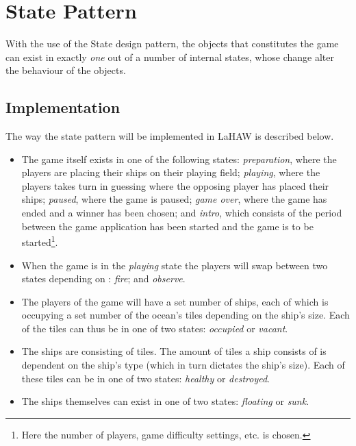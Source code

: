 
    \section{State Pattern}
    
    With the use of the State design pattern, the objects that constitutes the game can exist in exactly \emph{one} out of a number of internal states, whose change alter the behaviour of the objects.\cite{online:statepattern}
    
    
        \subsection{Implementation}
        The way the state pattern will be implemented in LaHAW is described below.
    
        \begin{itemize}
            \item The game itself exists in one of the following states: \emph{preparation}, where the players are placing their ships on their playing field; \emph{playing}, where the players takes turn in guessing where the opposing player has placed their ships; \emph{paused}, where the game is paused; \emph{game over}, where the game has ended and a winner has been chosen; and \emph{intro}, which consists of the period between the game application has been started and the game is to be started\footnote{Here the number of players, game difficulty settings, etc. is chosen.}.

            \item When the game is in the \emph{playing} state the players will swap between two states depending on : \emph{fire}; and \emph{observe}.
    
            \item The players of the game will have a set number of ships, each of which is occupying a set number of the ocean's tiles depending on the ship's size. Each of the tiles can thus be in one of two states: \emph{occupied} or \emph{vacant}.
    
            \item The ships are consisting of tiles. The amount of tiles a ship consists of is dependent on the ship's type (which in turn dictates the ship's size). Each of these tiles can be in one of two states: \emph{healthy} or \emph{destroyed}.
    
            \item The ships themselves can exist in one of two states: \emph{floating} or \emph{sunk}.            
    
        \end{itemize}
    
